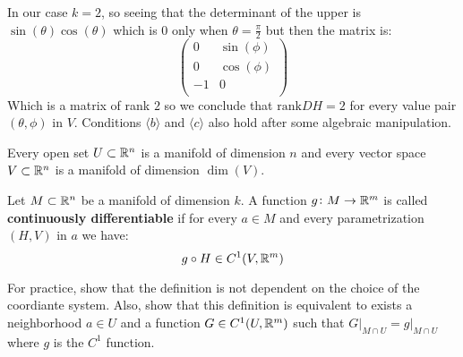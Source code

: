 \documentclass[11pt,a4paper]{article}
\begin{document}
In our case $k = 2$, so seeing that the determinant of the upper
is $\sin(\theta)\cos(\theta)$ which is $0$ only when 
$\theta = \frac{\pi}{2}$ but then the matrix is:
\[
  \begin{pmatrix}
  0 & \sin(\phi)\\
  0 & \cos(\phi)\\
  -1 & 0\\
  \end{pmatrix}
\]
Which is a matrix of rank $2$ so we conclude that $\mathrm{rank}DH = 2$
for every value pair $(\theta,\phi)$ in $V$. Conditions 
$\langle b \rangle$ and $\langle c \rangle$ also hold after some
algebraic manipulation.
\begin{remark}
  Every open set $U \subset \mathbb{R}^n$ is a manifold of dimension $n$
  and every vector space $V \subset \mathbb{R}^n$ is a manifold of dimension 
  $\dim(V)$.
\end{remark}


\begin{definition}
  Let $M \subset \mathbb{R}^n$ be a manifold of dimension $k$. A function
  $g \colon M \to \mathbb{R}^m$ is called \textbf{continuously differentiable}
  if for every $a \in M$ and every parametrization $(H,V)$ in $a$
  we have:
  \[
    g \circ H \in C^1(V, \mathbb{R}^m)
  \]
\end{definition}
\noindent
For practice, show that the definition is not dependent on the choice of 
the coordiante system. Also, show that this definition is equivalent to 
exists a neighborhood $a \in U$ and a function $G \in C^1(U,\mathbb{R}^m)$ such 
that  $G \vert_{M \cap U} = g \vert_{M \cap U}$ where $g$ is the $C^1$ 
function.

\newpage
\end{document}
